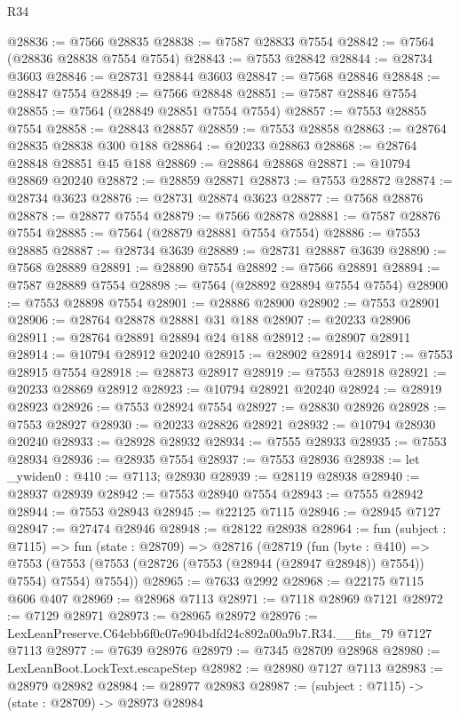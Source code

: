 \begin{lexlean}{R34}
\begin{coremodule}
@28836 := @7566 @28835
@28838 := @7587 @28833 @7554
@28842 := @7564 (@28836 @28838 @7554 @7554)
@28843 := @7553 @28842
@28844 := @28734 @3603
@28846 := @28731 @28844 @3603
@28847 := @7568 @28846
@28848 := @28847 @7554
@28849 := @7566 @28848
@28851 := @7587 @28846 @7554
@28855 := @7564 (@28849 @28851 @7554 @7554)
@28857 := @7553 @28855 @7554
@28858 := @28843 @28857
@28859 := @7553 @28858
@28863 := @28764 @28835 @28838 @300 @188
@28864 := @20233 @28863
@28868 := @28764 @28848 @28851 @45 @188
@28869 := @28864 @28868
@28871 := @10794 @28869 @20240
@28872 := @28859 @28871
@28873 := @7553 @28872
@28874 := @28734 @3623
@28876 := @28731 @28874 @3623
@28877 := @7568 @28876
@28878 := @28877 @7554
@28879 := @7566 @28878
@28881 := @7587 @28876 @7554
@28885 := @7564 (@28879 @28881 @7554 @7554)
@28886 := @7553 @28885
@28887 := @28734 @3639
@28889 := @28731 @28887 @3639
@28890 := @7568 @28889
@28891 := @28890 @7554
@28892 := @7566 @28891
@28894 := @7587 @28889 @7554
@28898 := @7564 (@28892 @28894 @7554 @7554)
@28900 := @7553 @28898 @7554
@28901 := @28886 @28900
@28902 := @7553 @28901
@28906 := @28764 @28878 @28881 @31 @188
@28907 := @20233 @28906
@28911 := @28764 @28891 @28894 @24 @188
@28912 := @28907 @28911
@28914 := @10794 @28912 @20240
@28915 := @28902 @28914
@28917 := @7553 @28915 @7554
@28918 := @28873 @28917
@28919 := @7553 @28918
@28921 := @20233 @28869 @28912
@28923 := @10794 @28921 @20240
@28924 := @28919 @28923
@28926 := @7553 @28924 @7554
@28927 := @28830 @28926
@28928 := @7553 @28927
@28930 := @20233 @28826 @28921
@28932 := @10794 @28930 @20240
@28933 := @28928 @28932
@28934 := @7555 @28933
@28935 := @7553 @28934
@28936 := @28935 @7554
@28937 := @7553 @28936
@28938 := let _ywiden0 : @410 := @7113; @28930
@28939 := @28119 @28938
@28940 := @28937 @28939
@28942 := @7553 @28940 @7554
@28943 := @7555 @28942
@28944 := @7553 @28943
@28945 := @22125 @7115
@28946 := @28945 @7127
@28947 := @27474 @28946
@28948 := @28122 @28938
@28964 := fun (subject : @7115) =>
  fun (state : @28709) =>
  @28716
    (@28719
      (fun (byte : @410) =>
      @7553 (@7553 (@7553 (@28726 (@7553 (@28944 (@28947 @28948)) @7554)) @7554) @7554) @7554))
@28965 := @7633 @2992
@28968 := @22175 @7115 @606 @407
@28969 := @28968 @7113
@28971 := @7118 @28969 @7121
@28972 := @7129 @28971
@28973 := @28965 @28972
@28976 := LexLeanPreserve.C64ebb6f0c07e904bdfd24c892a00a9b7.R34.__fits_79 @7127 @7113
@28977 := @7639 @28976
@28979 := @7345 @28709 @28968
@28980 := LexLeanBoot.LockText.escapeStep
@28982 := @28980 @7127 @7113
@28983 := @28979 @28982
@28984 := @28977 @28983
@28987 := (subject : @7115) -> (state : @28709) -> @28973 @28984

\end{coremodule}
\end{lexlean}
